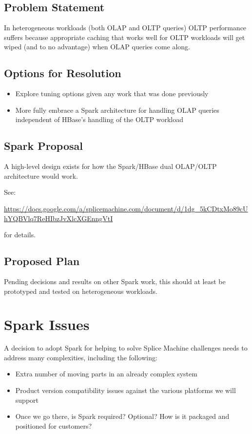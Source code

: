 \documentclass{article}
\begin{document}
\subsection{Problem Statement}

In heterogeneous workloads (both OLAP and OLTP queries) OLTP performance suffers because appropriate caching that works well for OLTP workloads will get wiped (and to no advantage) when OLAP queries come along.

\subsection{Options for Resolution}

\begin{itemize}
	\item Explore tuning options given any work that was done previously
 	\item More fully embrace a Spark architecture for handling OLAP queries independent of HBase's handling of the OLTP workload
\end{itemize}


\subsection{Spark Proposal}

A high-level design exists for how the Spark/HBase dual OLAP/OLTP architecture would work.  

\begin{sloppypar}
See:

 \url{https://docs.google.com/a/splicemachine.com/document/d/1dg_5kCDtxMo89cUhYQBVlq7ReHIbzJvXlcXGEnngVtI} 
 
 for details.
\end{sloppypar}

\subsection{Proposed Plan}

Pending decisions and results on other Spark work, this should at least be prototyped and tested on heterogeneous workloads.


\section{Spark Issues}

A decision to adopt Spark for helping to solve Splice Machine challenges needs to address many complexities, including the following:

\begin{itemize}
	\item Extra number of moving parts in an already complex system
	\item Product version compatibility issues against the various platforms we will support
	\item Once we go there, is Spark required?  Optional?  How is it packaged and positioned for customers?
\end{itemize}
\end{document}
